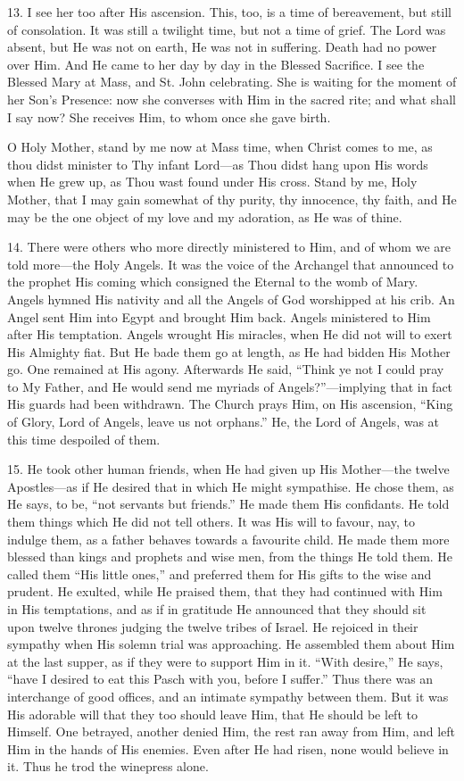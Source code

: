 13. I see her too after His
ascension. This, too, is a time of bereavement, but still of
consolation. It was still a twilight time, but not a time of grief. The
Lord was absent, but He was not on earth, He was not in suffering. Death
had no power over Him. And He came to her day by day in the Blessed
Sacrifice. I see the Blessed Mary at Mass, and St. John celebrating. She
is waiting for the moment of her Son's Presence: now she converses with
Him in the sacred rite; and what shall I say now? She receives Him, to
whom once she gave birth.

O Holy Mother, stand by me now
at Mass time, when Christ comes to me, as thou didst minister to Thy
infant Lord—as Thou didst hang upon His words when He grew up, as Thou
wast found under His cross. Stand by me, Holy Mother, that I may gain somewhat of thy purity, thy innocence, thy faith, and He may be the
one object of my love and my adoration, as He was of thine.

14. There were others who more
directly ministered to Him, and of whom we are told more—the Holy
Angels. It was the voice of the Archangel that announced to the prophet
His coming which consigned the Eternal to the womb of Mary. Angels
hymned His nativity and all the Angels of God worshipped at his crib. An
Angel sent Him into Egypt and brought Him back. Angels ministered to Him
after His temptation. Angels wrought His miracles, when He did not will
to exert His Almighty fiat. But He bade them go at length, as He had
bidden His Mother go. One remained at His agony. Afterwards He said, ``Think
ye not I could pray to My Father, and He would send me myriads of
Angels?''—implying that in fact His guards had been withdrawn. The
Church prays Him, on His ascension, ``King of Glory, Lord of Angels,
leave us not orphans.'' He, the Lord of Angels, was at this time
despoiled of them.

15. He took other human friends,
when He had given up His Mother—the twelve Apostles—as if He desired
that in which He might sympathise. He chose them, as He says, to be, ``not
servants but friends.'' He made them His confidants. He told them things
which He did not tell others. It was His will to favour, nay, to indulge
them, as a father behaves towards a favourite child. He made them more
blessed than kings and prophets and wise men, from the things He
told them. He called them ``His little ones,'' and preferred them for His
gifts to the wise and prudent. He exulted, while He praised them, that
they had continued with Him in His temptations, and as if in gratitude
He announced that they should sit upon twelve thrones judging the twelve
tribes of Israel. He rejoiced in their sympathy when His solemn trial
was approaching. He assembled them about Him at the last supper, as if
they were to support Him in it. ``With desire,'' He says, ``have I desired
to eat this Pasch with you, before I suffer.'' Thus there was an
interchange of good offices, and an intimate sympathy between them. But
it was His adorable will that they too should leave Him, that He should
be left to Himself. One betrayed, another denied Him, the rest ran away
from Him, and left Him in the hands of His enemies. Even after He had
risen, none would believe in it. Thus he trod the winepress alone.

